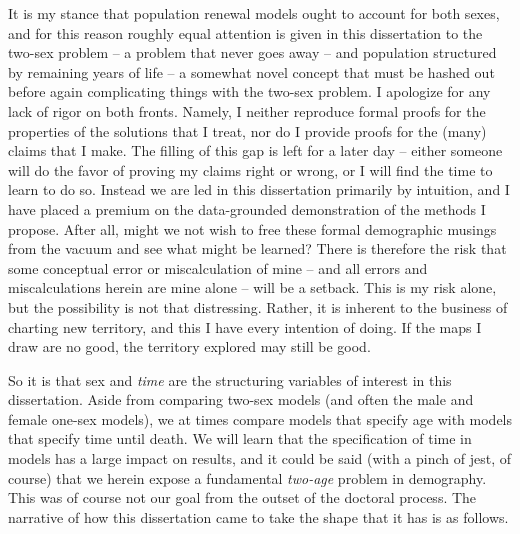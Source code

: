 It is my stance that population renewal models ought to account for both sexes,
and for this reason roughly equal attention is given in this dissertation to the
two-sex problem -- a problem that never goes away -- and population structured
by remaining years of life -- a somewhat novel concept that must be hashed out
before again complicating things with the two-sex problem. I apologize for any lack of
rigor on both fronts. Namely, I neither reproduce formal proofs for the
properties of the solutions that I treat, nor do I provide proofs for the
(many) claims that I make. The filling of this gap is left for a later day --
either someone will do the favor of proving my claims right or wrong, or I
will find the time to learn to do so. Instead we are led in this dissertation
primarily by intuition, and I have placed a premium on the
data-grounded demonstration of the methods I propose. After all, might we not
wish to free these formal demographic musings from the vacuum and see what might
be learned? There is therefore the risk that some conceptual error or
miscalculation of mine -- and all errors and miscalculations herein are mine
alone -- will be a setback. This is my risk alone, but the possibility is
not that distressing. Rather, it is inherent to the business of charting new
territory, and this I have every intention of doing. If the maps I draw are no
good, the territory explored may still be good.

So it is that sex and \textit{time} are the structuring variables of
interest in this dissertation. Aside from comparing two-sex models (and often the male
and female one-sex models), we at times compare models that
specify age with models that specify time until death. We will learn that the
specification of time in models has a large impact on results, and it could
be said (with a pinch of jest, of course) that we herein expose a
fundamental \textit{two-age} problem in demography. This was of course not our goal from the
outset of the doctoral process. The narrative of how this dissertation came to
take the shape that it has is as follows.

